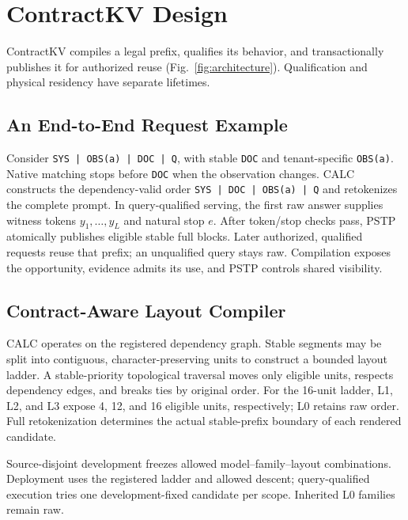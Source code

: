 \section{ContractKV Design}
\label{sec:design}

ContractKV compiles a legal prefix, qualifies its behavior, and transactionally publishes it for authorized reuse (Fig.~\ref{fig:architecture}). Qualification and physical residency have separate lifetimes.




\subsection{An End-to-End Request Example}
Consider \texttt{SYS | OBS(a) | DOC | Q}, with stable \texttt{DOC} and tenant-specific \texttt{OBS(a)}. Native matching stops before \texttt{DOC} when the observation changes. CALC constructs the dependency-valid order \texttt{SYS | DOC | OBS(a) | Q} and retokenizes the complete prompt. In query-qualified serving, the first raw answer supplies witness tokens $y_1,\ldots,y_L$ and natural stop $e$. After token/stop checks pass, PSTP atomically publishes eligible stable full blocks. Later authorized, qualified requests reuse that prefix; an unqualified query stays raw. Compilation exposes the opportunity, evidence admits its use, and PSTP controls shared visibility.

\subsection{Contract-Aware Layout Compiler}
\label{sec:calc}
CALC operates on the registered dependency graph. Stable segments may be split into contiguous, character-preserving units to construct a bounded layout ladder. A stable-priority topological traversal moves only eligible units, respects dependency edges, and breaks ties by original order. For the 16-unit ladder, L1, L2, and L3 expose 4, 12, and 16 eligible units, respectively; L0 retains raw order. Full retokenization determines the actual stable-prefix boundary of each rendered candidate.

Source-disjoint development freezes allowed model--family--layout combinations. Deployment uses the registered ladder and allowed descent; query-qualified execution tries one development-fixed candidate per scope. Inherited L0 families remain raw.

